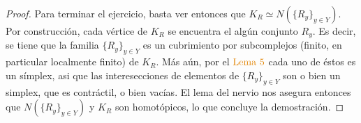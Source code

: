 \documentclass[11pt]{article}
\newcommand{\paint}[1]{\color{color}{#1}}
\begin{document}
\begin{proof}
Para terminar el ejercicio, basta ver entonces que $K_R \simeq N(\{R_y\}_{y \in Y})$. Por construcci\'on, cada v\'ertice de $K_R$ se encuentra el alg\'un conjunto $R_y$. Es decir, se tiene que la familia $\{R_y\}_{y \in Y}$ es un cubrimiento por subcomplejos (finito, en particular localmente finito) de $K_R$. M\'as a\'un, por el $\paint{\text{Lema $5$}}$ cada uno de \'estos es un s\'implex, asi que las interesecciones de elementos de $\{R_y\}_{y \in Y}$ son o bien un simplex, que es contr\'actil, o bien vac\'ias. El lema del nervio nos asegura entonces que $N(\{R_y\}_{y \in Y})$ y $K_R$ son homot\'opicos, lo que concluye la demostraci\'on.
\end{proof}
\end{document}
